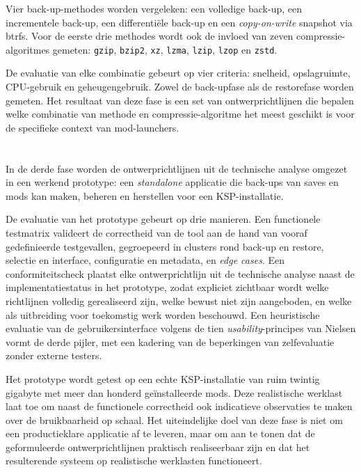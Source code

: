 Vier back-up-methodes worden vergeleken: een volledige back-up, een incrementele back-up, een differentiële back-up en een \textit{copy-on-write} snapshot via btrfs. Voor de eerste drie methodes wordt ook de invloed van zeven compressie-algoritmes gemeten: \texttt{gzip}, \texttt{bzip2}, \texttt{xz}, \texttt{lzma}, \texttt{lzip}, \texttt{lzop} en \texttt{zstd}.

De evaluatie van elke combinatie gebeurt op vier criteria: snelheid, opslagruimte, CPU-gebruik en geheugengebruik. Zowel de back-upfase als de restorefase worden gemeten. Het resultaat van deze fase is een set van ontwerprichtlijnen die bepalen welke combinatie van methode en compressie-algoritme het meest geschikt is voor de specifieke context van mod-launchers.

\section{}%
\label{sec:fase4-evaluatie}

In de derde fase worden de ontwerprichtlijnen uit de technische analyse omgezet in een werkend prototype: een \textit{standalone} applicatie die back-ups van saves en mods kan maken, beheren en herstellen voor een KSP-installatie.

De evaluatie van het prototype gebeurt op drie manieren. Een functionele testmatrix valideert de correctheid van de tool aan de hand van vooraf gedefinieerde testgevallen, gegroepeerd in clusters rond back-up en restore, selectie en interface, configuratie en metadata, en \textit{edge cases}. Een conformiteitscheck plaatst elke ontwerprichtlijn uit de technische analyse naast de implementatiestatus in het prototype, zodat expliciet zichtbaar wordt welke richtlijnen volledig gerealiseerd zijn, welke bewust niet zijn aangeboden, en welke als uitbreiding voor toekomstig werk worden beschouwd. Een heuristische evaluatie van de gebruikersinterface volgens de tien \textit{usability}-principes van Nielsen vormt de derde pijler, met een kadering van de beperkingen van zelfevaluatie zonder externe testers.

Het prototype wordt getest op een echte KSP-installatie van ruim twintig gigabyte met meer dan honderd geïnstalleerde mods. Deze realistische werklast laat toe om naast de functionele correctheid ook indicatieve observaties te maken over de bruikbaarheid op schaal. Het uiteindelijke doel van deze fase is niet om een productieklare applicatie af te leveren, maar om aan te tonen dat de geformuleerde ontwerprichtlijnen praktisch realiseerbaar zijn en dat het resulterende systeem op realistische werklasten functioneert.
